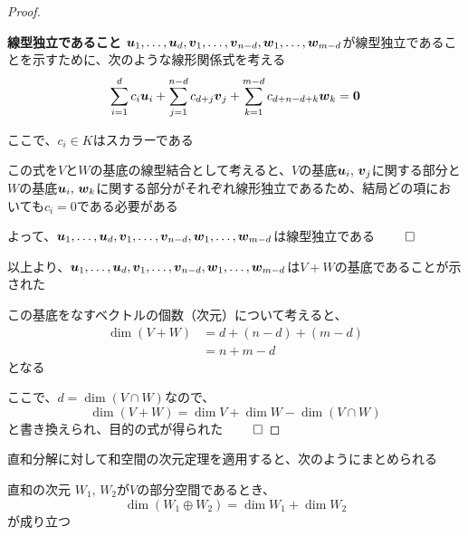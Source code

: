 \documentclass[../../../topic_linear-algebra]{subfiles}
\begin{document}
\begin{proof}
  \begin{subpattern}{\bfseries 線型独立であること}
    $\vb*{u}_1, \dots, \vb*{u}_d, \vb*{v}_1, \dots, \vb*{v}_{n-d}, \vb*{w}_1, \dots, \vb*{w}_{m-d}$が線型独立であることを示すために、次のような線形関係式を考える
    \begin{equation*}
      \sum_{i=1}^d c_i \vb*{u}_i + \sum_{j=1}^{n-d} c_{d+j} \vb*{v}_j + \sum_{k=1}^{m-d} c_{d+n-d+k} \vb*{w}_k = \vb*{0}
    \end{equation*}

    ここで、$c_i \in K$はスカラーである

    \br

    この式を$V$と$W$の基底の線型結合として考えると、$V$の基底$\vb*{u}_i, \, \vb*{v}_j$に関する部分と$W$の基底$\vb*{u}_i, \, \vb*{w}_k$に関する部分がそれぞれ線形独立であるため、結局どの項においても$c_i = 0$である必要がある

    \br

    よって、$\vb*{u}_1, \dots, \vb*{u}_d, \vb*{v}_1, \dots, \vb*{v}_{n-d}, \vb*{w}_1, \dots, \vb*{w}_{m-d}$は線型独立である $\qed$
  \end{subpattern}

  \br

  以上より、$\vb*{u}_1, \dots, \vb*{u}_d, \vb*{v}_1, \dots, \vb*{v}_{n-d}, \vb*{w}_1, \dots, \vb*{w}_{m-d}$は$V + W$の基底であることが示された

  \br

  この基底をなすベクトルの個数（次元）について考えると、
  \begin{align*}
    \dim(V + W) & = d + (n - d) + (m - d) \\
                & = n + m - d
  \end{align*}
  となる

  ここで、$d = \dim(V \cap W)$なので、
  \begin{equation*}
    \dim(V + W) = \dim V + \dim W - \dim(V \cap W)
  \end{equation*}
  と書き換えられ、目的の式が得られた $\qed$
\end{proof}

\sectionline

直和分解に対して和空間の次元定理を適用すると、次のようにまとめられる

\begin{theorem}{直和の次元}\label{thm:dim-direct-sum}
  $W_1,\,W_2$が$V$の部分空間であるとき、
  \begin{equation*}
    \dim(W_1 \oplus W_2) = \dim W_1 + \dim W_2
  \end{equation*}
  が成り立つ
\end{theorem}
\end{document}
